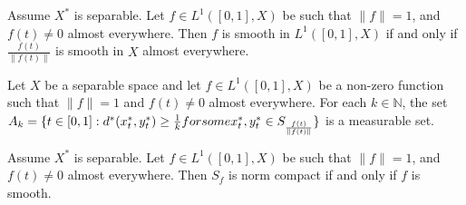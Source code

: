 \documentclass[10pt,a4paper]{amsart}
\begin{document}
\begin{theorem}\label{3t1}
   Assume $X^*$ is separable. Let $ f \in L^{1}([0,1],X)$ be such that $ \|f\| = 1 $, and $f(t)\neq 0$ almost everywhere. Then $ f $ is smooth in $L^{1}([0,1],X)$ if and only if $ \frac{f(t)}{\|f(t)\|} $ is smooth in $X$ almost everywhere.
\end{theorem}

    \begin{lemma}\label{L1}
        Let $X$ be a separable space and let $f\in L^{1}([0,1],X)$ be a non-zero function such that $\|f\|=1$ and $f(t)\neq0$ almost everywhere. For each $k\in \mathbb{N}$, the set $A_{k}=\{t\in [0,1]:d^*(x_{t}^*, y_{t}^*)\geq \frac{1}{k}\textnormal{ for some }x_{t}^*, y_{t}^*\in S_{\frac{f(t)}{\|f(t)\|}}\}$ is a measurable set.
    \end{lemma}

\begin{theorem}\label{Th316}
    Assume $X^*$ is separable. Let $f\in L^{1}([0,1],X)$ be such that $\|f\|=1$, and $f(t)\neq0$ almost everywhere. Then $S_f$ is norm compact if and only if $f$ is smooth.
\end{theorem}
\end{document}
